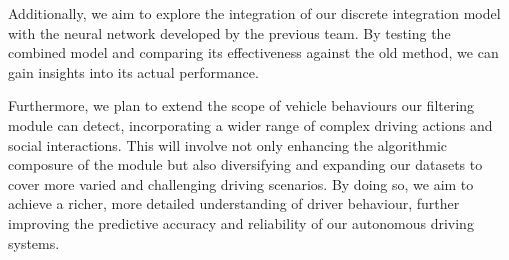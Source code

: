 Additionally, we aim to explore the integration of our discrete integration model with the neural network developed by the previous team.
By testing the combined model and comparing its effectiveness against the old method, we can gain insights into its actual performance. 

Furthermore, we plan to extend the scope of vehicle behaviours our filtering module can detect, incorporating a wider range of complex driving actions and social interactions. This will involve not only enhancing the algorithmic composure of the module but also diversifying and expanding our datasets to cover more varied and challenging driving scenarios. By doing so, we aim to achieve a richer, more detailed understanding of driver behaviour, further improving the predictive accuracy and reliability of our autonomous driving systems.